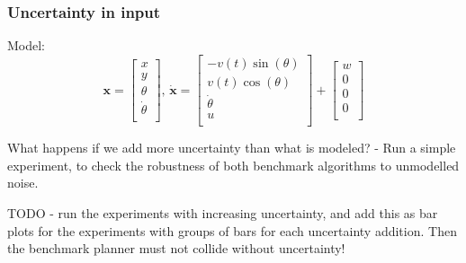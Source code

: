 \subsubsection{Uncertainty in input}
Model:
\begin{equation}
  \label{eq:model-dynamics-experiments}
  \mathbf{x} =
  \begin{bmatrix}
    x \\ y \\ \theta \\ \dot{\theta} \\
  \end{bmatrix}, \, \dot{\mathbf{x}} =
  \begin{bmatrix}
    -v(t)   \sin(\theta) \\
    v(t) \cos(\theta) \\
    \dot{\theta} \\
    u \\
  \end{bmatrix}
  +
  \begin{bmatrix}
    w \\
    0 \\
    0 \\
    0 \\
  \end{bmatrix}
\end{equation}

What happens if we add more uncertainty than what is modeled? - Run a simple
experiment, to check the robustness of both benchmark algorithms to unmodelled
noise.

TODO - run the experiments with increasing uncertainty, and add this as bar
plots for the experiments with groups of bars for each uncertainty addition.
Then the benchmark planner must not collide without uncertainty!

